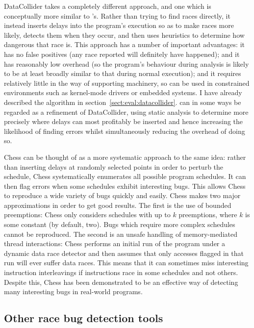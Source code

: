 DataCollider\needCite{} takes a completely different approach, and one
which is conceptually more similar to {\technique}'s.  Rather than
trying to find races directly, it instead inserts delays into the
program's execution so as to make races more likely, detects them when
they occur, and then uses heuristics to determine how dangerous that
race is.  This approach has a number of important advantages: it has
no false positives (any race reported will definitely have happened);
and it has reasonably low overhead (so the program's behaviour during
analysis is likely to be at least broadly similar to that during
normal execution); and it requires relatively little in the way of
supporting machinery, so can be used in constrained environments such
as kernel-mode drivers or embedded systems.  I have already described
the algorithm in section~\ref{sect:eval:datacollider}.  {\Technique}
can in some ways be regarded as a refinement of DataCollider, using
static analysis to determine more precisely where delays can most
profitably be inserted and hence increasing the likelihood of finding
errors whilst simultaneously reducing the overhead of doing so.

Chess\needCite{} can be thought of as a more systematic approach to
the same idea: rather than inserting delays at randomly selected
points in order to perturb the schedule, Chess systematically
enumerates all possible program schedules.  It can then flag errors
when some schedules exhibit interesting bugs.  This allows Chess to
reproduce a wide variety of bugs quickly and easily.  Chess makes two
major approximations in order to get good results.  The first is the
use of bounded preemptions: Chess only considers schedules with up to
$k$ preemptions, where $k$ is some constant (by default, two).  Bugs
which require more complex schedules cannot be reproduced.  The second
is an unsafe handling of memory-mediated thread interactions: Chess
performs an initial run of the program under a dynamic data race
detector and then assumes that only accesses flagged in that run will
ever suffer data races.  This means that it can sometimes miss
interesting instruction interleavings if instructions race in some
schedules and not others.  Despite this, Chess has been demonstrated
to be an effective way of detecting many interesting bugs in
real-world programs.

\subsection{Other race bug detection tools}


